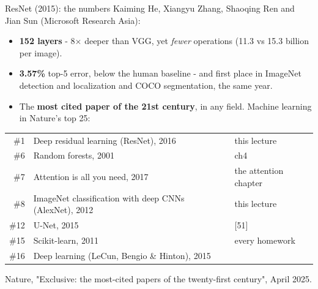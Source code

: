 \documentclass[aspectratio=169]{beamer}
\begin{document}
\begin{frame}{ResNet (2015): the numbers}
  \small
  Kaiming He, Xiangyu Zhang, Shaoqing Ren and Jian Sun (Microsoft Research Asia):
  \begin{itemize}\small
    \item \textbf{152 layers} - 8$\times$ deeper than VGG, yet \emph{fewer} operations (11.3 vs
      15.3 billion per image).
    \item \textbf{3.57\%} top-5 error, below the human baseline - and first place in ImageNet
      detection and localization and COCO segmentation, the same year.
    \item The \textbf{most cited paper of the 21st century}, in any field. Machine learning in
      Nature's top 25:
  \end{itemize}
  \vskip -2pt
  \begin{center}\footnotesize
    \begin{tabular}{r l l}
      \#1 & Deep residual learning (ResNet), 2016 & this lecture\\
      \#6 & Random forests, 2001 & ch4\\
      \#7 & Attention is all you need, 2017 & the attention chapter\\
      \#8 & ImageNet classification with deep CNNs (AlexNet), 2012 & this lecture\\
      \#12 & U-Net, 2015 & [51]\\
      \#15 & Scikit-learn, 2011 & every homework\\
      \#16 & Deep learning (LeCun, Bengio \& Hinton), 2015 & \\
    \end{tabular}
  \end{center}
  \vskip -4pt
  {\scriptsize\color{gray} Nature, "Exclusive: the most-cited papers of the twenty-first
  century", April 2025.}
\end{frame}
\end{document}

